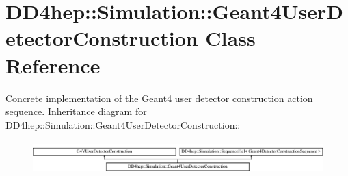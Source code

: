 \hypertarget{class_d_d4hep_1_1_simulation_1_1_geant4_user_detector_construction}{
\section{DD4hep::Simulation::Geant4UserDetectorConstruction Class Reference}
\label{class_d_d4hep_1_1_simulation_1_1_geant4_user_detector_construction}
}


Concrete implementation of the Geant4 user detector construction action sequence.  
Inheritance diagram for DD4hep::Simulation::Geant4UserDetectorConstruction::\begin{figure}[H]
\begin{center}
\leavevmode
\includegraphics[height=1.24722cm]{class_d_d4hep_1_1_simulation_1_1_geant4_user_detector_construction}
\end{center}
\end{figure}
